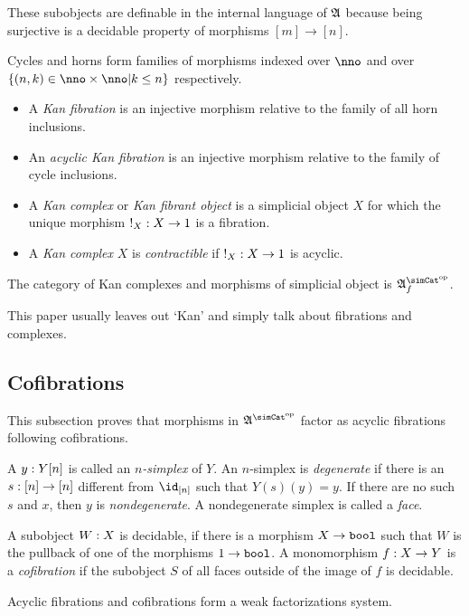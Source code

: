 \documentclass[csh.tex]{subfiles}
\begin{document}
These subobjects are definable in the internal language of $\mathfrak A$ because being surjective is a decidable property of morphisms $[m]\to[n]$.

\begin{definition} Cycles and horns form families of morphisms indexed over $\nno$ and over $\set{(n,k)\in\nno\times\nno| k\leq n }$ respectively.
\begin{itemize}
\item A \emph{Kan fibration} is an injective morphism relative to the family of all horn inclusions.
\item An \emph{acyclic Kan fibration} is an injective morphism relative to the family of cycle inclusions.
\item A \emph{Kan complex} or \emph{Kan fibrant object} is a simplicial object $X$ for which the unique morphism $!_X: X\to 1$ is a fibration.
\item A \emph{Kan complex} $X$ is \emph{contractible} if $!_X: X\to 1$ is acyclic.
\end{itemize}\label{Kan}

The category of Kan complexes and morphisms of simplicial object is $\ambient\s\f$.
\end{definition}
This paper usually leaves out `Kan' and simply talk about fibrations and complexes.

\subsection{Cofibrations}
This subsection proves that morphisms in $\ambient\s$ factor as acyclic fibrations following cofibrations. 

\begin{definition} A $y: Y[n]$ is called an \emph{$n$-simplex} of $Y$. An $n$-simplex is \emph{degenerate} if there is an $s: [n]\to [n]$ different from $\id_{[n]}$ such that $Y(s)(y)=y$. If there are no such $s$ and $x$, then $y$ is \emph{nondegenerate}. A nondegenerate simplex is called a \emph{face}. 

A subobject $W: X$ is decidable, if there is a morphism $X\to\mathtt{bool}$ such that $W$ is the pullback of one of the morphisms $1\to\mathtt{bool}$. A monomorphism $f: X\to Y$ is a \emph{cofibration} if the subobject $S$ of all faces outside of the image of $f$ is decidable.
\end{definition}

\begin{lemma} Acyclic fibrations and cofibrations form a weak factorizations system.
\end{lemma}
\end{document}
